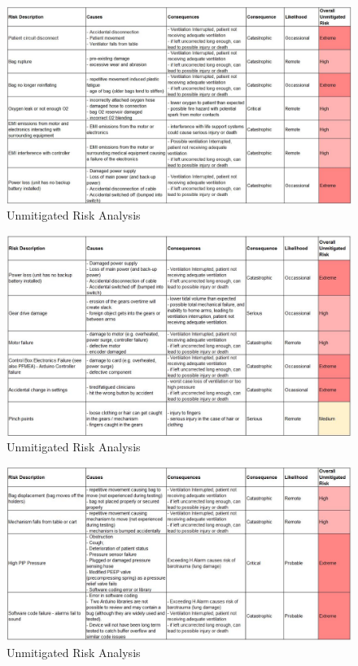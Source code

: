 \documentclass[]{article}
\begin{document}
\begin{appendices}
\begin{figure}
	\includegraphics[scale= 0.6]{figures/unmit_1.jpg}
	\caption{Unmitigated Risk Analysis}
	\label{fig:unmit1}
\end{figure}

\begin{figure}
	\includegraphics[scale= 0.65]{figures/unmit_2.jpg}
	\caption{Unmitigated Risk Analysis}
	\label{fig:unmit2}
\end{figure}

\begin{figure}
	\includegraphics[scale= 0.7]{figures/unmit_3.jpg}
	\caption{Unmitigated Risk Analysis}
	\label{fig:unmit3}
\end{figure}




\end{appendices}
\end{document}
